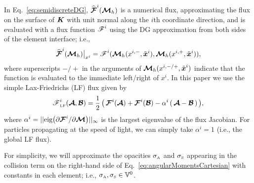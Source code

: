 In Eq.~\eqref{eq:semidiscreteDG}, $\widehat{\boldsymbol{\mathcal{F}}}^{i}(\boldsymbol{\mathcal{M}}_{h})$ is a numerical flux, approximating the flux on the surface of $\boldsymbol{K}$ with unit normal along the $i$th coordinate direction, and is evaluated with a flux function $\boldsymbol{\mathscr{F}}^{i}$ using the DG approximation from both sides of the element interface; i.e.,
\begin{equation}
  \widehat{\boldsymbol{\mathcal{F}}}^{i}(\boldsymbol{\mathcal{M}}_{h})\big|_{x^{i}}=\boldsymbol{\mathscr{F}}^{i}(\boldsymbol{\mathcal{M}}_{h}(x^{i,-},\tilde{\boldsymbol{x}}^{i}),\boldsymbol{\mathcal{M}}_{h}(x^{i,+},\tilde{\boldsymbol{x}}^{i})),
\end{equation}
where superscripts $-/+$ in the arguments of $\boldsymbol{\mathcal{M}}_{h}(x^{i,-/+},\tilde{\boldsymbol{x}}^{i})$ indicate that the function is evaluated to the immediate left/right of $x^{i}$.  
In this paper we use the simple Lax-Friedrichs (LF) flux given by
\begin{equation}
  \boldsymbol{\mathscr{F}}_{\mbox{\tiny LF}}^{i}(\boldsymbol{\mathcal{A}},\boldsymbol{\mathcal{B}})
  =\frac{1}{2}\,\big(\,\boldsymbol{\mathcal{F}}^{i}(\boldsymbol{\mathcal{A}})+\boldsymbol{\mathcal{F}}^{i}(\boldsymbol{\mathcal{B}})-\alpha^{i}\,(\,\boldsymbol{\mathcal{A}}-\boldsymbol{\mathcal{B}}\,)\,\big),
\end{equation}
where $\alpha^{i}=||\mbox{eig}\big(\partial\boldsymbol{\mathcal{F}}^{i}/\partial\boldsymbol{\mathcal{M}}\big)||_{\infty}$ is the largest eigenvalue of the flux Jacobian.  
For particles propagating at the speed of light, we can simply take $\alpha^{i}=1$ (i.e., the global LF flux).  

For simplicity, we will approximate the opacities $\sigma_{\mbox{\tiny A}}$ and $\sigma_{\mbox{\tiny S}}$ appearing in the collision term on the right-hand side of Eq.~\eqref{eq:angularMomentsCartesian} with constants in each element; i.e., $\sigma_{\mbox{\tiny A}},\sigma_{\mbox{\tiny S}}\in\mathbb{V}^{0}$.  